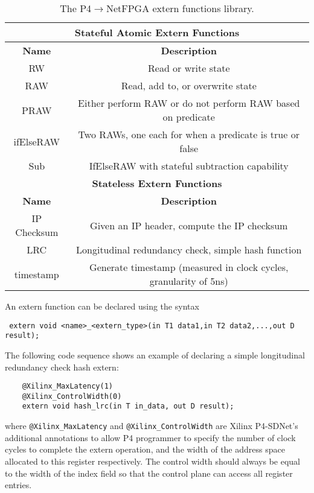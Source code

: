 \begin{table}[!ht]
	\begin{center}
		\caption{The P4$\rightarrow$NetFPGA extern functions library.}
		\label{externs}
		\begin{tabular}{ | c | c | }
			\hline
			\multicolumn{2}{|c|}{\textbf{Stateful Atomic Extern Functions}} \\ \hline
			\textbf{Name} & \textbf{Description}  \\ \hline
			RW & Read or write state \\ \hline
			RAW & Read, add to, or overwrite state  \\ \hline
			PRAW & Either perform RAW or do not perform RAW based on predicate \\ \hline
			ifElseRAW & Two RAWs, one each for when a predicate is true or false \\ \hline
			Sub & IfElseRAW with stateful subtraction capability \\ \hline
			
			\multicolumn{2}{|c|}{\textbf{Stateless Extern Functions}} \\ \hline
			\textbf{Name} & \textbf{Description}  \\ \hline
			IP Checksum & Given an IP header, compute the IP checksum \\ \hline
			LRC & Longitudinal redundancy check, simple hash function \\ \hline
			timestamp & Generate timestamp (measured in clock cycles, granularity of 5ns) \\ \hline
		\end{tabular}
	\end{center}
\end{table}

An extern function can be declared using the syntax

{\renewcommand{\baselinestretch}{0.8}\small
	\centering
	\begin{verbatim}
 extern void <name>_<extern_type>(in T1 data1,in T2 data2,...,out D result);
	\end{verbatim}
} 

The following code sequence shows an example of declaring a simple longitudinal redundancy check hash extern:

{\renewcommand{\baselinestretch}{0.8}\small
	\begin{verbatim}
    @Xilinx_MaxLatency(1)
    @Xilinx_ControlWidth(0)
    extern void hash_lrc(in T in_data, out D result);
	\end{verbatim}
}
where \texttt{@Xilinx\_MaxLatency} and \texttt{@Xilinx\_ControlWidth} are Xilinx P4-SDNet's additional annotations to allow P4 programmer to specify the number of clock cycles to complete the extern operation, and the width of the address space allocated to this register respectively. The control width should always be equal to the width of the index field so that the control plane can access all register entries.

